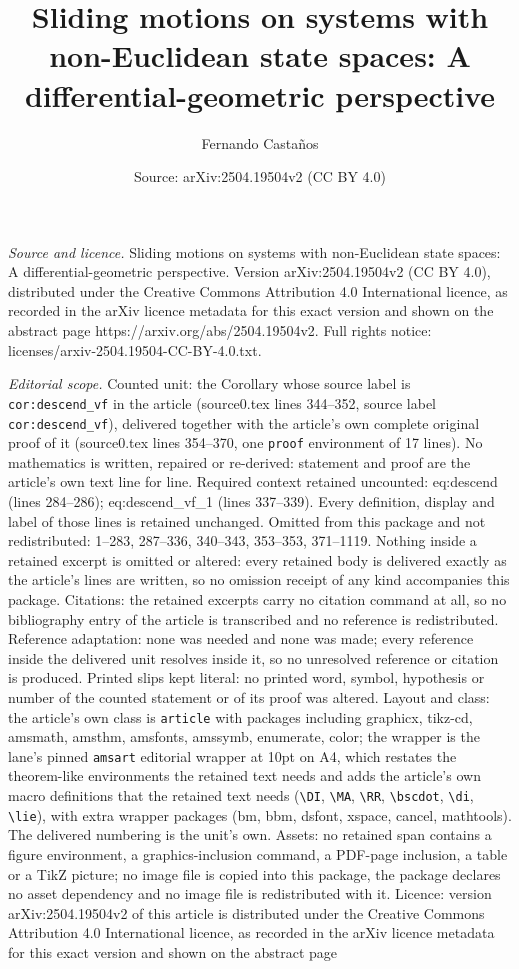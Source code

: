 \documentclass[10pt,a4paper]{amsart}
\title[Sliding motions on systems with non-Euclidean state spaces: ]{Sliding motions on systems with non-Euclidean state spaces: A differential-geometric perspective}
\author{Fernando Casta\~nos}
\date{Source: arXiv:2504.19504v2 (CC BY 4.0)}
\begin{document}
\maketitle

\noindent\emph{Source and licence.} Sliding motions on systems with non-Euclidean state spaces: A differential-geometric perspective. Version arXiv:2504.19504v2 (CC BY 4.0), distributed under the Creative Commons Attribution 4.0 International licence, as recorded in the arXiv licence metadata for this exact version and shown on the abstract page https://arxiv.org/abs/2504.19504v2. Full rights notice: licenses/arxiv-2504.19504-CC-BY-4.0.txt.\par\smallskip

\noindent\textit{Editorial scope.} Counted unit: the Corollary whose source label is \texttt{cor:descend\_vf} in the article (source0.tex lines 344--352, source label \texttt{cor:descend\_vf}), delivered together with the article's own complete original proof of it (source0.tex lines 354--370, one \texttt{proof} environment of 17 lines). No mathematics is written, repaired or re-derived: statement and proof are the article's own text line for line. Required context retained uncounted: eq:descend (lines 284--286); eq:descend\_vf\_1 (lines 337--339). Every definition, display and label of those lines is retained unchanged. Omitted from this package and not redistributed: 1--283, 287--336, 340--343, 353--353, 371--1119. Nothing inside a retained excerpt is omitted or altered: every retained body is delivered exactly as the article's lines are written, so no omission receipt of any kind accompanies this package. Citations: the retained excerpts carry no citation command at all, so no bibliography entry of the article is transcribed and no reference is redistributed. Reference adaptation: none was needed and none was made; every reference inside the delivered unit resolves inside it, so no unresolved reference or citation is produced. Printed slips kept literal: no printed word, symbol, hypothesis or number of the counted statement or of its proof was altered. Layout and class: the article's own class is \texttt{article} with packages including graphicx, tikz-cd, amsmath, amsthm, amsfonts, amssymb, enumerate, color; the wrapper is the lane's pinned \texttt{amsart} editorial wrapper at 10pt on A4, which restates the theorem-like environments the retained text needs and adds the article's own macro definitions that the retained text needs (\texttt{\textbackslash DI}, \texttt{\textbackslash MA}, \texttt{\textbackslash RR}, \texttt{\textbackslash bscdot}, \texttt{\textbackslash di}, \texttt{\textbackslash lie}), with extra wrapper packages (bm, bbm, dsfont, xspace, cancel, mathtools). The delivered numbering is the unit's own. Assets: no retained span contains a figure environment, a graphics-inclusion command, a PDF-page inclusion, a table or a TikZ picture; no image file is copied into this package, the package declares no asset dependency and no image file is redistributed with it. Licence: version arXiv:2504.19504v2 of this article is distributed under the Creative Commons Attribution 4.0 International licence, as recorded in the arXiv licence metadata for this exact version and shown on the abstract page 
\end{document}
